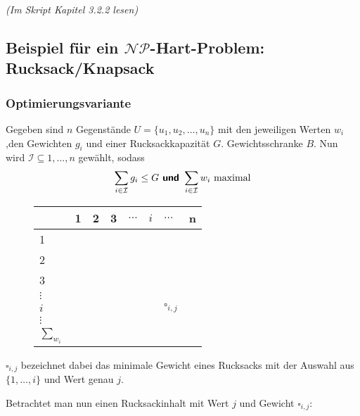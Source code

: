 \documentclass{scrartcl}%
\begin{document}
    \textit{(Im Skript Kapitel 3.2.2 lesen)}

    \subsection*{Beispiel für ein $\mathcal{N}\mathcal{P}$-Hart-Problem: Rucksack/Knapsack}
    \subsubsection*{Optimierungsvariante}
    Gegeben sind $n$ Gegenstände $U=\{u_1,u_2,\dots,u_n\}$ mit den jeweiligen
    Werten $w_i$,den Gewichten $g_i$ und einer Rucksackkapazität $G$.
    Gewichtsschranke $B$. Nun wird $\mathcal{I} \subseteq {1, \dots, n}$ gewählt, sodass
    \begin{equation*}
        \sum_{i \in \mathcal{I}} g_i \leq G \text{\textbf{\textsf{ und }}} \sum_{i \in \mathcal{I}} w_i \text{ maximal}
    \end{equation*}

    \begin{figure}[H]
        \centering
        \begin{table}[H]
            \centering
            \begin{tabular}{C{1cm}|C{0.5cm}C{0.5cm}C{0.5cm}C{0.5cm}C{0.5cm}C{0.5cm}C{0.5cm}}
               & 1 & 2 & 3 & $\dots$ & $i$ & $\dots$ & n \\  &  &  &  &  &  &  &  \\
               2 &  &  &  &  &  &  &  \\
               3 &  &  &  &  &  &  &  \\
               $\vdots$ &  &  &  &  &  &  &  \\
               $i$ &  &  &  &  &  & $\square_{i,j}$ &  \\
               $\vdots$ &  &  &  &  &  &  &  \\
               $\sum_{w_i}$ &  &  &  &  &  &  &  \\

            \end{tabular}
        \end{table}
    \end{figure}

    $\square_{i,j}$ bezeichnet dabei das minimale Gewicht eines Rucksacks mit der Auswahl aus $\{1, \dots, i\}$ und Wert genau $j$.

    \vspace*{0.3cm}
    Betrachtet man nun einen Rucksackinhalt mit Wert $j$ und Gewicht $\square_{i,j}$:
\end{document}
